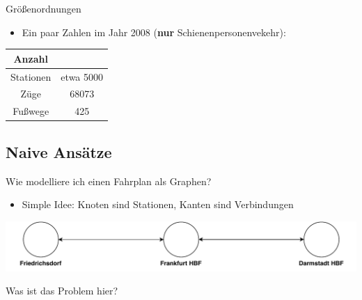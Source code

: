 	


\begin{frame}{Größenordnungen}
	\begin{itemize}
		\item Ein paar Zahlen im Jahr 2008 (\textbf{nur} Schienenpersonenvekehr):
	\end{itemize}

	\vspace{3em}
	\begin{center}
		\begin{tabular}{ c|c } 
			Anzahl & \\
 			\hline
 			Stationen & etwa\texttrademark{} 5000 \\
 			Züge & 68073 \\ 
 			Fußwege & 425 \\
		\end{tabular}
	\end{center}
\end{frame}


\subsection{Naive Ansätze}
\begin{frame}{Wie modelliere ich einen Fahrplan als Graphen?}
	\begin{itemize}
		\item Simple Idee: Knoten sind Stationen, Kanten sind Verbindungen 
	\end{itemize}
	
	\vspace{3em}
	\includegraphics[width=\linewidth]{images/simple-approach.pdf}
	\vspace{3em}
	\begin{block}{}
		Was ist das Problem hier?
	\end{block}
\end{frame}

